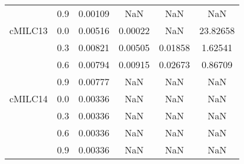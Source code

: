 \begin{longtable}{cccccc}
        & 0.9 & 0.00109 & NaN & NaN & NaN \\
cMILC13 & 0.0 & 0.00516 & 0.00022 & NaN & 23.82658 \\
        & 0.3 & 0.00821 & 0.00505 & 0.01858 & 1.62541 \\
        & 0.6 & 0.00794 & 0.00915 & 0.02673 & 0.86709 \\
        & 0.9 & 0.00777 & NaN & NaN & NaN \\
cMILC14 & 0.0 & 0.00336 & NaN & NaN & NaN \\
        & 0.3 & 0.00336 & NaN & NaN & NaN \\
        & 0.6 & 0.00336 & NaN & NaN & NaN \\
        & 0.9 & 0.00336 & NaN & NaN & NaN \\
\end{longtable}

